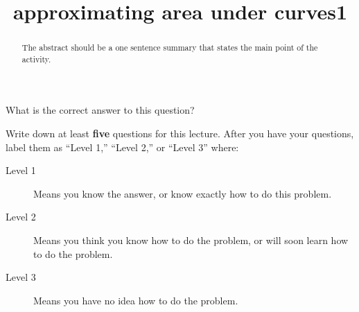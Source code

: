 \documentclass{ximera}
\title{approximating area under curves1}
\begin{document}
\begin{abstract}
  The abstract should be a one sentence summary that states the main point of the activity.
\end{abstract}

\maketitle

\begin{question}
  What is the correct answer to this question?

  
    \begin{multipleChoice}
    \end{multipleChoice}  
  
\end{question}

Write down at least \textbf{five} questions for this lecture. After
you have your questions, label them as ``Level 1,'' ``Level 2,'' or ``Level 3'' where:
\begin{description}
\item[Level 1] Means you know the answer, or know exactly how to do this problem.
\item[Level 2] Means you think you know how to do the problem, or will soon learn how to do the problem.
\item[Level 3] Means you have no idea how to do the problem. 
\end{description}
\begin{question}
  \begin{freeResponse}
  \end{freeResponse}
\end{question}
\end{document}
